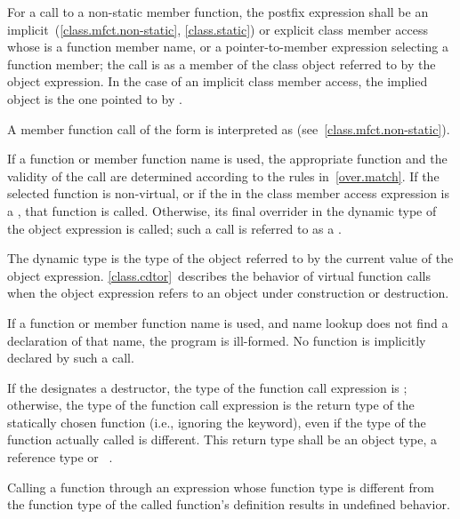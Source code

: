 \pnum
For a call to a non-static
member function,
the postfix expression shall be an
implicit~(\ref{class.mfct.non-static}, \ref{class.static}) or explicit
class member access whose  is a
function member name, or a pointer-to-member
expression selecting a function member; the call is as a member of
the class object referred to by the
object expression. In the case of an implicit class
member access, the implied object is the one pointed to by .
\begin{note}
A member function call of the form  is interpreted as
 (see~\ref{class.mfct.non-static}).
\end{note}

\pnum
If a function or member function name is used,
the appropriate function and the validity of the call are determined
according to the rules in~\ref{over.match}. If the selected
function is non-virtual, or if the  in the class
member access expression is a , that function is
called. Otherwise, its final overrider in the dynamic type
of the object expression is called; such a call is referred to as a
.
\begin{note}
The dynamic type is the type of the object referred to by the
current value of the object expression. \ref{class.cdtor}~describes the
behavior of virtual function calls when the object expression
refers to
an object under construction or destruction.
\end{note}

\pnum
\begin{note}
If a function or member function name is used, and name
lookup does not find a declaration of that name,
the program is ill-formed. No function is implicitly declared by such a
call.
\end{note}

\pnum
If the  designates a destructor,
the type of the function call expression is ; otherwise, the
type of the function call expression is the return type of the
statically chosen function (i.e., ignoring the  keyword),
even if the type of the function actually called is different.
%
This return type shall be an object type, a reference type or \cv{}~.

\pnum
Calling a function through an
expression whose function type is different
from the function type of the called function's
definition results in undefined behavior.

